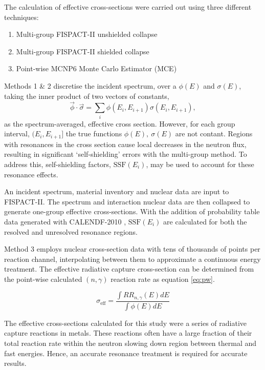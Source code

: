 The calculation of effective cross-sections were carried out using three different techniques:

\begin{enumerate}
  \item Multi-group FISPACT-II unshielded collapse
  \item Multi-group FISPACT-II shielded collapse
  \item Point-wise MCNP6 Monte Carlo Estimator (MCE)
\end{enumerate}

Methods 1 \& 2 discretise the incident spectrum, over a  $\phi(E)$ and $\sigma(E)$, taking the inner product of two vectors of constants,
$$\vec{\phi} \cdot \vec{\sigma} = \sum_i \phi(E_i , E_{i+1}) \sigma(E_i , E_{i+1}),$$
as the spectrum-averaged, effective cross section. However, for each group interval, $(E_{i}, E_{i+1}]$ the true functions $\phi(E),\ \sigma(E)$ are not contant. Regions with resonances in the cross section cause local decreases in the neutron flux, resulting in significant `self-shielding' errors with the multi-group method. To address this, self-shielding factors, $\mathrm{SSF}(E_i)$, may be used to account for these resonance effects. 

An incident spectrum, material inventory and nuclear data are input to FISPACT-II. The spectrum and interaction nuclear data are then collapsed to generate one-group effective cross-sections. With the addition of probability table data generated with CALENDF-2010 \cite{sublet2011}, $\mathrm{SSF}(E_i)$ are calculated for both the resolved and unresolved resonance regions.

Method 3 employs nuclear cross-section data with tens of thousands of points per reaction channel, interpolating between them to approximate a continuous energy treatment. The effective radiative capture cross-section can be determined from the point-wise calculated $(n,\gamma)$ reaction rate as equation \ref{eq:pw}. 

\begin{equation}
\label{eq:pw}
\sigma_\mathrm{eff} = \frac{\int RR_{n,\gamma}(E) dE}{\int \phi(E) dE}
\end{equation}


The effective cross-sections calculated for this study were a series of radiative capture reactions in metals. These reactions often have a large fraction of their total reaction rate within the neutron slowing down region between thermal and fast energies. Hence, an accurate resonance treatment is required for accurate results. 

